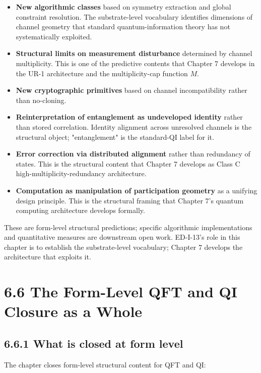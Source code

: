 \documentclass[11pt]{book}
\begin{document}
\begin{itemize}
\item \textbf{New algorithmic classes} based on symmetry extraction and global constraint resolution. The substrate-level vocabulary identifies dimensions of channel geometry that standard quantum-information theory has not systematically exploited.
\item \textbf{Structural limits on measurement disturbance} determined by channel multiplicity. This is one of the predictive contents that Chapter 7 develops in the UR-1 architecture and the multiplicity-cap function $M$.
\item \textbf{New cryptographic primitives} based on channel incompatibility rather than no-cloning.
\item \textbf{Reinterpretation of entanglement as undeveloped identity} rather than stored correlation. Identity alignment across unresolved channels is the structural object; "entanglement" is the standard-QI label for it.
\item \textbf{Error correction via distributed alignment} rather than redundancy of states. This is the structural content that Chapter 7 develops as Class C high-multiplicity-redundancy architecture.
\item \textbf{Computation as manipulation of participation geometry} as a unifying design principle. This is the structural framing that Chapter 7's quantum computing architecture develops formally.
\end{itemize}

These are form-level structural predictions; specific algorithmic implementations and quantitative measures are downstream open work. ED-I-13's role in this chapter is to establish the substrate-level vocabulary; Chapter 7 develops the architecture that exploits it.

\section{6.6 The Form-Level QFT and QI Closure as a Whole}

\subsection{6.6.1 What is closed at form level}

The chapter closes form-level structural content for QFT and QI:
\end{document}
